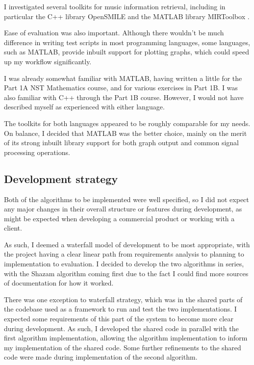 \documentclass[12pt,a4paper,twoside,openright]{report}
\begin{document}
I investigated several toolkits for music information retrieval, including in particular the C++ library OpenSMILE \cite{Eyben10} and the MATLAB library MIRToolbox \cite{Lartillot07}.

Ease of evaluation was also important. Although there wouldn't be much difference in writing test scripts in most programming languages, some languages, such as MATLAB, provide inbuilt support for plotting graphs, which could speed up my workflow significantly.

I was already somewhat familiar with MATLAB, having written a little for the Part 1A NST Mathematics course, and for various exercises in Part 1B. I was also familiar with C++ through the Part 1B course. However, I would not have described myself as experienced with either language.

The toolkits for both languages appeared to be roughly comparable for my needs. On balance, I decided that MATLAB was the better choice, mainly on the merit of its strong inbuilt library support for both graph output and common signal processing operations.


\subsection{Development strategy}
\label{section:devstrat}

Both of the algorithms to be implemented were well specified, so I did not expect any major changes in their overall structure or features during development, as might be expected when developing a commercial product or working with a client. 

As such, I deemed a waterfall model of development to be most appropriate, with the project having a clear linear path from requirements analysis to planning to implementation to evaluation. I decided to develop the two algorithms in series, with the Shazam algorithm coming first due to the fact I could find more sources of documentation for how it worked.

There was one exception to waterfall strategy, which was in the shared parts of the codebase used as a framework to run and test the two implementations. I expected some requirements of this part of the system to become more clear during development. As such, I developed the shared code in parallel with the first algorithm implementation, allowing the algorithm implementation to inform my implementation of the shared code. Some further refinements to the shared code were made during implementation of the second algorithm.
\end{document}
